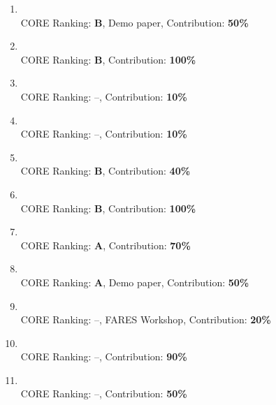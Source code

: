 \begin{enumerate}
  \item {} \\
  \textbullet\enspace CORE Ranking: \textbf{B}, Demo paper, Contribution: \textbf{50\%}

  \item {} \\
  \textbullet\enspace CORE Ranking: \textbf{B}, Contribution: \textbf{100\%}

  \item {} \\
  \textbullet\enspace CORE Ranking: --, Contribution: \textbf{10\%}
  
  \item {} \\
  \textbullet\enspace CORE Ranking: --, Contribution: \textbf{10\%}
  
  \item {} \\
  \textbullet\enspace CORE Ranking: \textbf{B}, Contribution: \textbf{40\%}
  
  \item {} \\
  \textbullet\enspace CORE Ranking: \textbf{B}, Contribution: \textbf{100\%}
  
  \item {} \\
  \textbullet\enspace CORE Ranking: \textbf{A}, Contribution: \textbf{70\%}
  
  \item {} \\
  \textbullet\enspace CORE Ranking: \textbf{A}, Demo paper, Contribution: \textbf{50\%}
  
  \item {} \\
  \textbullet\enspace CORE Ranking: --, FARES Workshop, Contribution: \textbf{20\%} %
  
  \item {} \\
  \textbullet\enspace CORE Ranking: --, Contribution: \textbf{90\%}
  
  \item {} \\
  \textbullet\enspace CORE Ranking: --, Contribution: \textbf{50\%}
  

\end{enumerate}
